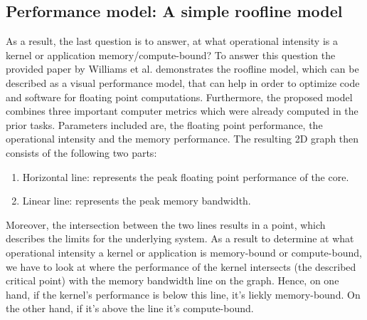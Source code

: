 \documentclass[unicode,11pt,a4paper,oneside,numbers=endperiod,openany]{scrartcl}
\begin{document}
\subsection{Performance model: A simple roofline model}

As a result, the last question is to answer, at what operational intensity is a kernel or application memory/compute-bound? To 
answer this question the provided paper by Williams et al. demonstrates the roofline model, which can be described as a 
visual performance model, that can help in order to optimize code and software for floating point computations. Furthermore, 
the proposed model combines three important computer metrics which were already computed in the prior tasks. Parameters included
are, the floating point performance, the operational intensity and the memory performance. The resulting 2D graph then consists
of the following two parts:
\begin{enumerate}
    \item Horizontal line: represents the peak floating point performance of the core.
    \item Linear line: represents the peak memory bandwidth.
\end{enumerate}
Moreover, the intersection between the two lines results in a point, which describes the limits for the underlying 
system. As a result to determine at what operational intensity a kernel or application is memory-bound or compute-bound,
we have to look at where the performance of the kernel intersects (the described critical point) with the memory
bandwidth line on the graph. Hence, on one hand, if the kernel's performance is below this line, it's liekly memory-bound. 
On the other hand, if it's above the line it's compute-bound.
\end{document}
